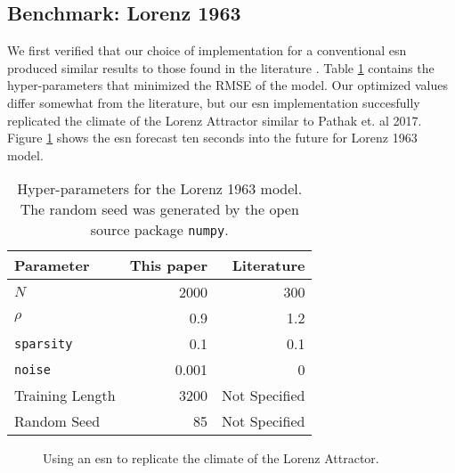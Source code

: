 \subsection{Benchmark: Lorenz 1963}

We first verified that our choice of implementation for a conventional \gls{esn}
produced similar results to those found in the literature
\cite{pathak_using_2017}. Table \ref{tab:lorenzparam} contains the hyper-parameters
that minimized the RMSE of the model. Our optimized values differ
somewhat from the literature, but our \gls{esn} implementation
succesfully replicated the climate of the Lorenz Attractor similar to Pathak
et. al 2017. Figure \ref{fig:lorenz63} shows the \gls{esn} forecast ten seconds
into the future for Lorenz 1963 model.


\begin{table}[h]
  \centering
  \caption{Hyper-parameters for the Lorenz 1963 model. The random seed was generated by the open source package \texttt{numpy}.}
  \label{tab:lorenzparam}
  \begin{tabular}{l r r}
    \hline
    Parameter & This paper & Literature \cite{pathak_using_2017}\\
    \hline
    $N$ & 2000& 300\\
    $\rho$& 0.9&1.2\\
    \texttt{sparsity}& 0.1& 0.1\\
    \texttt{noise}& 0.001& 0\\
    Training Length & 3200& Not Specified\\
    Random Seed & 85 & Not Specified\\
    \hline
  \end{tabular}
\end{table}
\begin{figure}[h]
  \centering
  
  \caption{Using an \gls{esn} to replicate the climate of the Lorenz Attractor.}
  \label{fig:lorenz63}
\end{figure}
